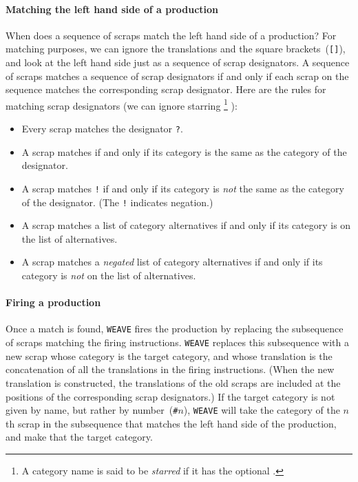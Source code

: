 \paragraph{Matching the left hand side of a production}
When does a sequence of scraps match the left hand side of a
production?
For matching purposes, we can ignore the translations and the square
brackets~({\tt []}), and look at the left hand side just as a sequence
of scrap designators.
A sequence of scraps matches a sequence of scrap designators if and
only if each scrap on the sequence matches the corresponding scrap
designator.
Here are the rules for matching scrap designators (we can
ignore starring%
\footnote{A category name is said to be {\em starred} if it has the
optional {\tt *}.}%
):
\begin{itemize}
\item
Every scrap matches the designator {\tt ?}.
\item
A scrap matches  if and only if its category
is the same as the category of the designator.
\item
A scrap matches {\tt!} if and only if its category
is {\em not} the same as the category of the designator.
(The {\tt !} indicates negation.)
\item
A scrap matches a list of category alternatives if and only if its
category is on the list of alternatives.
\item
A scrap matches a {\em negated} list of category alternatives if and
only if its category is {\em not} on the list of alternatives.
\end{itemize}

\paragraph{Firing a production}
Once a match is found, {\tt WEAVE} fires the production by replacing
the subsequence of scraps matching the firing instructions.
{\tt WEAVE} replaces this subsequence with a new scrap whose category
is the target category, and whose translation is the concatenation of
all the translations in the firing instructions.
(When the new translation is constructed, the
translations of the old scraps are included at the positions of the
corresponding scrap designators.)
If the target category is not given by name, but rather by
number~({\tt \#$n$}), {\tt WEAVE} will take the category of the $n$th
scrap in the subsequence that matches the left hand side of the
production, and make that the target category.

